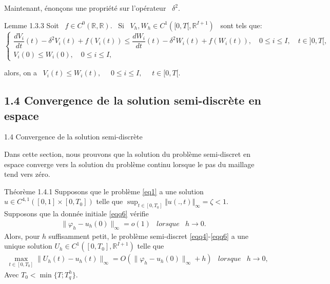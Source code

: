 \documentclass[10pt]{beamer}
\begin{document}
\begin{frame}
  Maintenant, énonçons une propriété sur l'opérateur \ $ \delta^{2} .$ \
 \begin{block}{Lemme 1.3.3}
   Soit \ $f\in C^0(\mathbb{R},\mathbb{R}).$ \ Si \ $V_h, W_h \in C^1\left([0,T[,\mathbb{R}^{I+1}\right)$ \ sont tels que:
    \begin{equation} 
 \begin{cases} 
  \dfrac{dV_i}{dt}(t)-\delta^2V_i(t)+f\left(V_i(t)\right)\leqslant \dfrac{dW_i}{dt}(t)-\delta^2W_i(t)+f\left(W_i(t)\right),\quad 0\leqslant i\leqslant I,\quad t\in ]0,T[,\\ 
			V_i(0)\leqslant W_i(0),\quad 0\leqslant i\leqslant I,
     \end{cases}
 \end{equation}
   
    alors, on a \ $ V_i(t)\leqslant W_i(t),$ \ \ $ 0\leqslant i\leqslant I ,$ \ \ $t\in [0,T[.$ \ \\
 \end{block}
 \end{frame}
 
   \begin{frame}
      \subsection{1.4 Convergence de la solution semi-discrète en espace }
         \begin{block}{1.4 Convergence de la solution semi-discrète}\end{block}

Dans cette section, nous prouvons que la solution du problème semi-discret en espace converge vers la solution du problème continu lorsque le pas du maillage tend vers zéro.
    
    \begin{block}{Théorème 1.4.1}
 Supposons que le problème \eqref{eq1} a une solution $u\in C^{4,1}([0,1]\times [0,T_{0}])$ telle que $ \displaystyle \sup_{t \in [0,T_{0}]}\Vert u(.,t)\Vert_{\infty}=\zeta <1$. Supposons que la donnée initiale \eqref{eqq6}  vérifie
\begin{eqnarray}  
\| \varphi_{h}- u_{h}(0)  \| _{\infty}= o(1) & lorsque & h \longrightarrow 0.
\end{eqnarray}
   Alors, pour $ h $ suffisamment petit, le problème semi-discret \eqref{eqq4}-\eqref{eqq6} a une unique solution 
$ U_{h}\in C^{1}([0,T_{0}],\mathbb{R}^{I+1})  $ telle que
\begin{eqnarray*}
\max_{t \in [0,T_{0}]}\| U_{h}(t)-u_{h}(t) \|_{\infty}= O(\|
\varphi_{h}- u_{h}(0)  \| _{\infty}+ h) & lorsque & h \longrightarrow 0,
\end{eqnarray*}
Avec $T_{0} < \min \{T; T_{q}^{h}\}$.
  
   \end{block}
   \end{frame}  		
 
\end{document}
